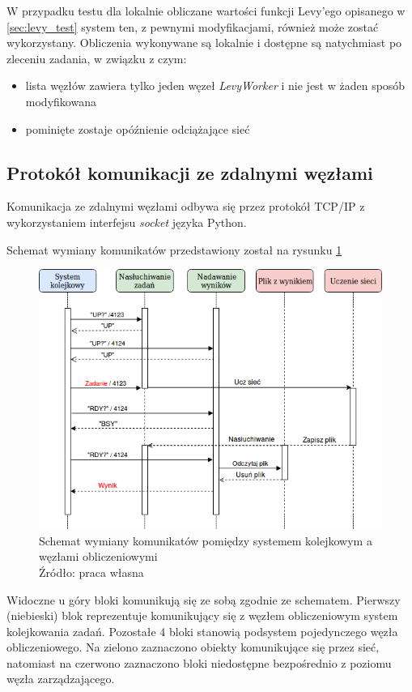 W przypadku testu dla lokalnie obliczane wartości funkcji Levy'ego opisanego w \ref{sec:levy_test} system ten, z pewnymi modyfikacjami, również może zostać wykorzystany.
Obliczenia wykonywane są lokalnie i dostępne są natychmiast po zleceniu zadania, w związku z czym:
\begin{itemize}
  \item lista węzłów zawiera tylko jeden węzeł \textit{LevyWorker} i nie jest w żaden sposób modyfikowana
  \item pominięte zostaje opóźnienie odciążające sieć
\end{itemize}

\subsection{Protokół komunikacji ze zdalnymi węzłami}\label{sec:communication}

Komunikacja ze zdalnymi węzłami odbywa się przez protokół TCP/IP z wykorzystaniem interfejsu \textit{socket} języka Python.

Schemat wymiany komunikatów przedstawiony został na rysunku \ref{fig:komunikacja}
\begin{figure}[h!tb]
	 \centering
	 \includegraphics[width = 1.0\linewidth]{img/komunikacja}
	 \caption{Schemat wymiany komunikatów pomiędzy systemem kolejkowym a węzłami obliczeniowymi \\
              Źródło: praca własna}
	 \label{fig:komunikacja}
\end{figure}

Widoczne u góry bloki komunikują się ze sobą zgodnie ze schematem.
Pierwszy (niebieski) blok reprezentuje komunikujący się z węzłem obliczeniowym system kolejkowania zadań.
Pozostałe 4 bloki stanowią podsystem pojedynczego węzła obliczeniowego.
Na zielono zaznaczono obiekty komunikujące się przez sieć, natomiast na czerwono zaznaczono bloki niedostępne bezpośrednio z poziomu węzła zarządzającego.

